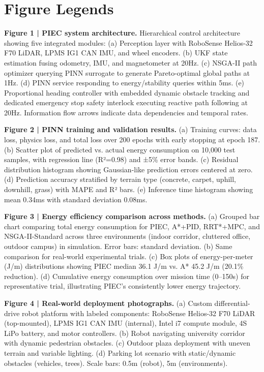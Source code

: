 \documentclass[pdflatex,sn-nature]{sn-jnl}%
\begin{document}
\section*{Figure Legends}

\textbf{Figure 1 | PIEC system architecture.} Hierarchical control architecture showing five integrated modules: (a) Perception layer with RoboSense Helios-32 F70 LiDAR, LPMS IG1 CAN IMU, and wheel encoders. (b) UKF state estimation fusing odometry, IMU, and magnetometer at 20Hz. (c) NSGA-II path optimizer querying PINN surrogate to generate Pareto-optimal global paths at 1Hz. (d) PINN service responding to energy/stability queries within 5ms. (e) Proportional heading controller with embedded dynamic obstacle tracking and dedicated emergency stop safety interlock executing reactive path following at 20Hz. Information flow arrows indicate data dependencies and temporal rates.

\textbf{Figure 2 | PINN training and validation results.} (a) Training curves: data loss, physics loss, and total loss over 200 epochs with early stopping at epoch 187. (b) Scatter plot of predicted vs. actual energy consumption on 10,000 test samples, with regression line (R²=0.98) and ±5\% error bands. (c) Residual distribution histogram showing Gaussian-like prediction errors centered at zero. (d) Prediction accuracy stratified by terrain type (concrete, carpet, uphill, downhill, grass) with MAPE and R² bars. (e) Inference time histogram showing mean 0.34ms with standard deviation 0.08ms.

\textbf{Figure 3 | Energy efficiency comparison across methods.} (a) Grouped bar chart comparing total energy consumption for PIEC, A*+PID, RRT*+MPC, and NSGA-II-Standard across three environments (indoor corridor, cluttered office, outdoor campus) in simulation. Error bars: standard deviation. (b) Same comparison for real-world experimental trials. (c) Box plots of energy-per-meter (J/m) distributions showing PIEC median 36.1 J/m vs. A* 45.2 J/m (20.1\% reduction). (d) Cumulative energy consumption over mission time (0--150s) for representative trial, illustrating PIEC's consistently lower energy trajectory.

\textbf{Figure 4 | Real-world deployment photographs.} (a) Custom differential-drive robot platform with labeled components: RoboSense Helios-32 F70 LiDAR (top-mounted), LPMS IG1 CAN IMU (internal), Intel i7 compute module, 4S LiPo battery, and motor controllers. (b) Robot navigating university corridor with dynamic pedestrian obstacles. (c) Outdoor plaza deployment with uneven terrain and variable lighting. (d) Parking lot scenario with static/dynamic obstacles (vehicles, trees). Scale bars: 0.5m (robot), 5m (environments).
\end{document}
